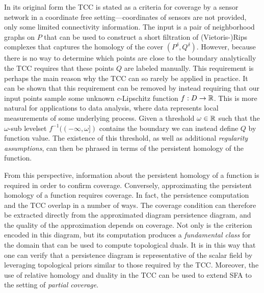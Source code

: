 In its original form the TCC is stated as a criteria for coverage by a sensor network in a coordinate free setting---coordinates of sensors are not provided, only some limited connectivity information.
The input is a pair of neighborhood graphs on $P$ that can be used to construct a short filtration of (Vietoris-)Rips complexes that captures the homology of the cover $(P^\delta, Q^\delta)$.
However, because there is no way to determine which points are close to the boundary analytically the TCC requires that these points $Q$ are labeled manually.
This requirement is perhaps the main reason why the TCC can so rarely be applied in practice.
It can be shown that this requirement can be removed by instead requiring that our input points sample some unknown $c$-Lipschitz function $f : D\to \mathbb{R}$.
This is more natural for applications to data analysis, where data represents local measurements of some underlying process.
Given a threshold $\omega\in\mathbb{R}$ such that the $\omega$-sub levelset $f^{-1}((-\infty,\omega])$ contains the boundary we can instead define $Q$ by function value.
The existence of this threshold, as well as additional \emph{regularity assumptions}, can then be phrased in terms of the persistent homology of the function.


From this perspective, information about the persistent homology of a function is required in order to confirm coverage.
Conversely, approximating the persistent homology of a function requires coverage.
In fact, the persistence computation and the TCC overlap in a number of ways.
The coverage condition can therefore be extracted directly from the approximated diagram persistence diagram, and the quality of the approximation depends on coverage.
Not only is the criterion encoded in this diagram, but its computation produces a \emph{fundamental class} for the domain that can be used to compute topological duals.
It is in this way that one can verify that a persistence diagram is representative of the scalar field by leveraging topological priors similar to those required by the TCC.
Moreover, the use of relative homology and duality in the TCC can be used to extend SFA to the setting of \emph{partial coverage}.
